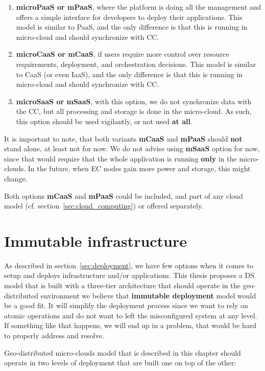 \begin{enumerate}[start=1,label={(\bfseries \arabic*)}]
	\item \textbf{microPaaS or mPaaS}, where the platform is doing all the management and offers a simple interface for developers to deploy their applications. This model is similar to PaaS, and the only difference is that this is running in micro-cloud and should synchronize with CC.
	\item \textbf{microCaaS or mCaaS}, if users require more control over resource requirements, deployment, and orchestration decisions. This model is similar to CaaS (or even IaaS), and the only difference is that this is running in micro-cloud and should synchronize with CC.
	\item \textbf{microSaaS or mSaaS}, with this option, we do not synchronize data with the CC, but all processing and storage is done in the micro-cloud. As such, this option should be used vigilantly, or not used \textbf{at all}.
\end{enumerate}

\noindent
It is important to note, that both variants \textbf{mCaaS} and \textbf{mPaaS} should \textbf{not} stand alone, at least not for now. We do not advise using \textbf{mSaaS} option for now, since that would require that the whole application is running \textbf{only} in the micro-clouds. In the future, when EC nodes gain more power and storage, this might change. 

Both options \textbf{mCaaS} and \textbf{mPaaS} could be included, and part of any cloud model (cf. section~\ref{sec:cloud_computing}) or offered separately.
%
%
\section{Immutable infrastructure}\label{sec:immutable_infrastructure}
%
As described in section~\ref{sec:deployment}, we have few options when it comes to setup and deploys infrastructure and/or applications. This thesis proposes a DS model that is built with a three-tier architecture that should operate in the geo-distributed environment we believe that \textbf{immutable deployment} model would be a good fit. It will simplify the deployment process since we want to rely on atomic operations and do not want to left the misconfigured system at any level. If something like that happens, we will end up in a problem, that would be hard to properly address and resolve.

Geo-distributed micro-clouds model that is described in this chapter should operate in two levels of deployment that are built one on top of the other:

